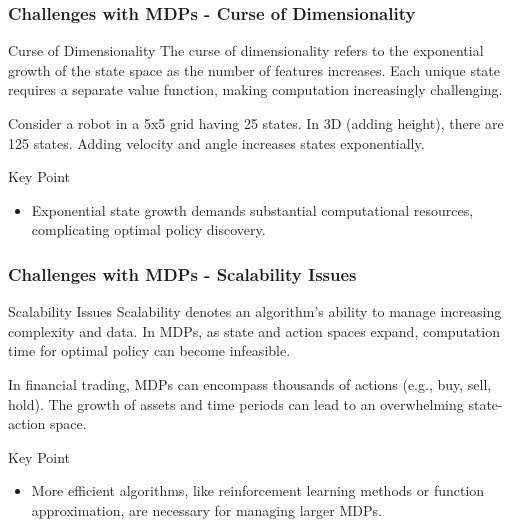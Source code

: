 \documentclass[aspectratio=169]{beamer}
\begin{document}
\begin{frame}[fragile]
    \frametitle{Challenges with MDPs - Curse of Dimensionality}
    \begin{block}{Curse of Dimensionality}
        The curse of dimensionality refers to the exponential growth of the state space as the number of features increases. Each unique state requires a separate value function, making computation increasingly challenging.
    \end{block}
    
    \begin{example}
        Consider a robot in a 5x5 grid having 25 states. In 3D (adding height), there are 125 states. Adding velocity and angle increases states exponentially. 
    \end{example}

    \begin{block}{Key Point}
        \begin{itemize}
            \item Exponential state growth demands substantial computational resources, complicating optimal policy discovery.
        \end{itemize}
    \end{block}
\end{frame}

\begin{frame}[fragile]
    \frametitle{Challenges with MDPs - Scalability Issues}
    \begin{block}{Scalability Issues}
        Scalability denotes an algorithm's ability to manage increasing complexity and data. In MDPs, as state and action spaces expand, computation time for optimal policy can become infeasible.
    \end{block}
    
    \begin{example}
        In financial trading, MDPs can encompass thousands of actions (e.g., buy, sell, hold). The growth of assets and time periods can lead to an overwhelming state-action space.
    \end{example}

    \begin{block}{Key Point}
        \begin{itemize}
            \item More efficient algorithms, like reinforcement learning methods or function approximation, are necessary for managing larger MDPs.
        \end{itemize}
    \end{block}
\end{frame}
\end{document}
